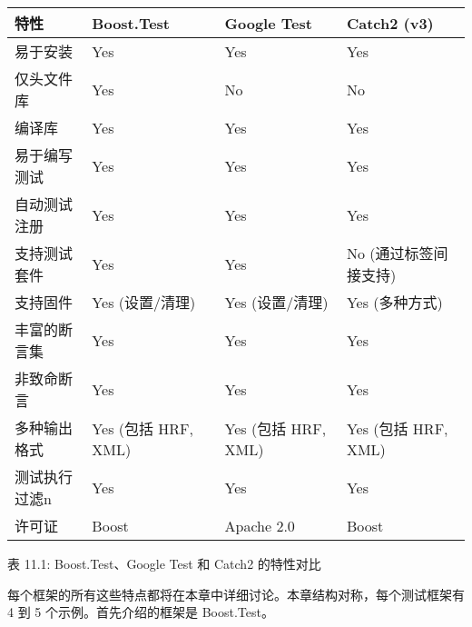 \begin{longtable}{|l|l|l|l|}
\hline
\textbf{特性}            & \textbf{Boost.Test}  & \textbf{Google Test} & \textbf{Catch2 (v3)}      \\ \hline
\endfirsthead
%
\endhead
%
易于安装             & Yes                  & Yes                  & Yes                       \\ \hline
仅头文件库                  & Yes                  & No                   & No                        \\ \hline
编译库            & Yes                  & Yes                  & Yes                       \\ \hline
易于编写测试         & Yes                  & Yes                  & Yes                       \\ \hline
自动测试注册 & Yes                  & Yes                  & Yes                       \\ \hline
支持测试套件        & Yes                  & Yes                  & No (通过标签间接支持) \\ \hline
支持固件           & Yes (设置/清理) & Yes (设置/清理) & Yes (多种方式)       \\ \hline
丰富的断言集         & Yes                  & Yes                  & Yes                       \\ \hline
非致命断言           & Yes                  & Yes                  & Yes                       \\ \hline
多种输出格式  & Yes (包括 HRF, XML) & Yes (包括 HRF, XML) & Yes (包括 HRF, XML) \\ \hline
测试执行过滤n & Yes                  & Yes                  & Yes                       \\ \hline
许可证                      & Boost                & Apache 2.0           & Boost                     \\ \hline
\end{longtable}

\begin{center}
表 11.1: Boost.Test、Google Test 和 Catch2 的特性对比
\end{center}

每个框架的所有这些特点都将在本章中详细讨论。本章结构对称，每个测试框架有 4 到 5 个示例。首先介绍的框架是 Boost.Test。